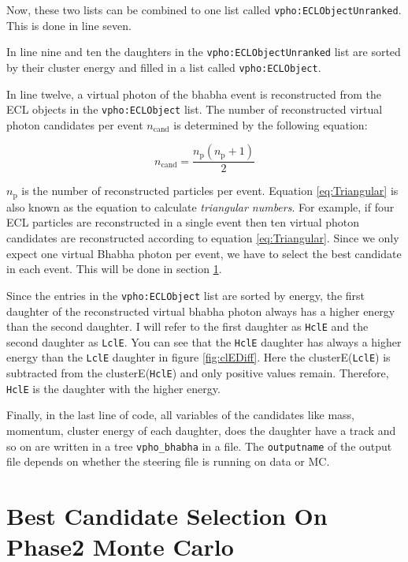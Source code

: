 \documentclass[a4paper,11pt,twosided,final,german,openbib,pdftex,listof=totoc,bibliography=totoc]{scrbook}
\begin{document}
Now, these two lists can be combined to one list called \texttt{vpho:ECLObjectUnranked}. This is done in line seven.

In line nine and ten the daughters in the \texttt{vpho:ECLObjectUnranked} list are sorted by their cluster energy and filled in a list called \texttt{vpho:ECLObject}.

In line twelve, a virtual photon of the bhabha event is reconstructed from the ECL objects in the \texttt{vpho:ECLObject} list. The number of reconstructed virtual photon candidates per event $n_{\textrm{cand}}$ is determined by the following equation\cite{triangular}:

\begin{equation}
n_{\textrm{cand}} = \frac{n_{\textrm{p}}(n_{\textrm{p}} +1)}{2}
\label{eq:Triangular}
\end{equation}

$n_{\textrm{p}}$ is the number of reconstructed particles per event. Equation \ref{eq:Triangular} is also known as the equation to calculate \textit{triangular numbers}. For example, if four ECL particles are reconstructed in a single event then ten virtual photon candidates are reconstructed according to equation \ref{eq:Triangular}. Since we only expect one virtual Bhabha photon per event, we have to select the best candidate in each event. This will be done in section \ref{sec:SelectingBhabhaMC}.

Since the entries in the \texttt{vpho:ECLObject} list are sorted by energy, the first daughter of the reconstructed virtual bhabha photon always has a higher energy than the second daughter. I will refer to the first daughter as \texttt{HclE} and the second daughter as \texttt{LclE}. You can see that the \texttt{HclE} daughter has always a higher energy than the \texttt{LclE} daughter in figure \ref{fig:clEDiff}. Here the clusterE(\texttt{LclE}) is subtracted from the clusterE(\texttt{HclE}) and only positive values remain. Therefore, \texttt{HclE} is the daughter with the higher energy.

Finally, in the last line of code, all variables of the candidates like mass, momentum, cluster energy of each daughter, does the daughter have a track and so on are written in a tree \texttt{vpho\_bhabha} in a file. The \texttt{outputname} of the output file depends on whether the steering file is running on data or MC. 


\section{Best Candidate Selection On Phase2 Monte Carlo}
\label{sec:SelectingBhabhaMC}
\end{document}
